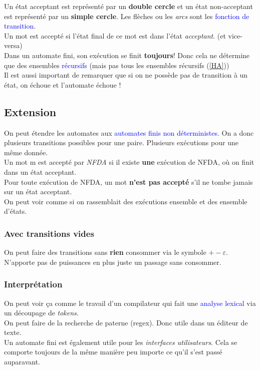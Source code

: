 \documentclass{report}
\begin{document}
Un état acceptant est représenté par un \textbf{double cercle} et un état non-acceptant est représenté par un \textbf{simple cercle}. Les flèches ou les \textit{arcs} sont les \textcolor{blue}{fonction de transition}.\\

Un mot est accepté si l'état final de ce mot est dans l'état \textit{acceptant}. (et vice-versa)\\
Dans un automate fini, son exécution se finit \textbf{toujours}! Donc cela ne détermine que des ensembles \textcolor{blue}{récursifs} (mais pas tous les ensembles récursifs (\ref{HA}))\\
Il est aussi important de remarquer que si on ne possède pas de transition à un état, on échoue et l'automate échoue !

\subsection{Extension}
On peut étendre les automates aux \textcolor{blue}{automates finis non déterministes}. On a donc plusieurs transitions possibles pour une paire. Plusieurs exécutions pour une même donnée.\\
Un mot m est accepté par \textit{NFDA} si il existe \textbf{une} exécution de NFDA, où on finit dans un état acceptant.\\
Pour toute exécution de NFDA, un mot \textbf{n'est pas accepté} s'il ne tombe jamais sur un état acceptant.\\

On peut voir comme si on rassemblait des exécutions ensemble et des ensemble d'états.

\subsubsection{Avec transitions vides}
On peut faire des transitions sans \textbf{rien} consommer via le symbole $+-\varepsilon$. N'apporte pas de puissances en plus juste un passage sans consommer.

\subsubsection{Interprétation}
On peut voir ça comme le travail d'un compilateur qui fait une \textcolor{blue}{analyse lexical} via un découpage de \textit{tokens}.\\
On peut faire de la recherche de paterne (regex). Donc utile dans un éditeur de texte.\\
Un automate fini est également utile pour les \textit{interfaces utilisateurs}. Cela se comporte toujours de la même manière peu importe ce qu'il s'est passé auparavant.
\end{document}
